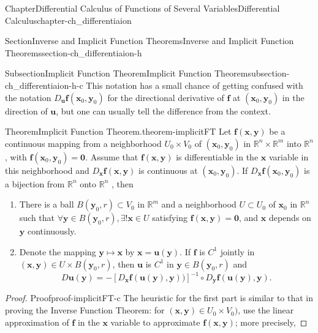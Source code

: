 \documentclass[oneside,10pt,]{book}
\numberwithin{equation}{section}
\newcommand{\bff}{\mathbf{f}}
\newcommand{\bu}{\mathbf{u}}
\newcommand{\bx}{\mathbf{x}}
\newcommand{\by}{\mathbf{y}}
\begin{document}
\begin{chapterptx}{Chapter}{Differential Calculus of Functions of Several Variables}{}{Differential Calculus}{}{}{chapter-ch_differentiaion}
\begin{sectionptx}{Section}{Inverse and Implicit Function Theorems}{}{Inverse and Implicit Function Theorems}{}{}{section-ch_differentiaion-h}
\begin{subsectionptx}{Subsection}{Implicit Function Theorem}{}{Implicit Function Theorem}{}{}{subsection-ch_differentiaion-h-c}
This notation has a small chance of getting confused with the notation \(D_{\bu}{\mathbf f}({\mathbf x}_{0},{\mathbf y}_{0})\) for the directional derivative of \(\bff\) at \(({\mathbf x}_{0},{\mathbf y}_{0})\) in the direction of \(\bu\), but one can usually tell the difference from the context.%
\begin{theorem}{Theorem}{Implicit Function Theorem.}{}{theorem-implicitFT}%
Let \({\mathbf f}({\mathbf x},{\mathbf y})\) be a continuous mapping from a neighborhood \(U_{0}\times V_{0}\) of \(({\mathbf x}_0,{\mathbf y}_0)\) in \(\mathbb R^n \times \mathbb R^m\) into \(\mathbb R^n\), with \({\mathbf f}({\mathbf x}_0,{\mathbf y}_0)={\mathbf 0}\). Assume that  \({\mathbf f}({\mathbf x},{\mathbf y})\) is differentiable in the \({\mathbf x}\) variable in this neighborhood and \(D_{{\mathbf x}}{\mathbf f}({\mathbf x},{\mathbf y})\) is continuous at \(({\mathbf x}_0,{\mathbf y}_0)\). If \(D_{{\mathbf x}}{\mathbf f}({\mathbf x}_0,{\mathbf y}_0)\) is a bijection from \(\mathbb R^n\) onto \(\mathbb R^n\) , then %
\begin{enumerate}
\item{}There is a ball \(B({\mathbf y}_0, r)\subset V_{0}\) in \(\mathbb R^m\) and a neighborhood \(U\subset U_{0}\) of \({\mathbf x}_0\) in \(\mathbb R^n\) such that \(\forall {\mathbf y} \in B({\mathbf y}_0, r), \exists ! {\mathbf x} \in U\) satisfying \(\bff({\mathbf x}, {\mathbf y})={\mathbf 0}\), and \({\mathbf x}\) depends on \({\mathbf y}\) continuously.%
\item{}Denote the mapping \({\mathbf y} \mapsto {\mathbf x}\) by \({\mathbf x} = {\mathbf u}({\mathbf y})\). If \(\bff\) is \(C^1\) jointly in \(({\mathbf x}, {\mathbf y})\in U\times B({\mathbf y}_0, r)\), then \({\mathbf u}\) is \(C^1\) in \({\mathbf y}\in B({\mathbf y}_0, r)\) and%
\begin{equation*}
D{\mathbf u} ({\mathbf y}) = -\left[D_{\mathbf x}{\mathbf f}({\mathbf u}({\mathbf y}),{\mathbf y}))\right]^{-1} \circ D_{\mathbf y}{\mathbf f}({\mathbf u}({\mathbf y}),{\mathbf y}).
\end{equation*}
%
\end{enumerate}
\end{theorem}
\begin{proof}{Proof}{}{proof-implicitFT-c}
The heuristic for the first part is similar to that in proving the Inverse Function Theorem: for \((\bx, \by)\in U_{0}\times V_{0})\), use the linear approximation of \({\mathbf f}\)  in the \({\mathbf x}\) variable to approximate \({\mathbf f}({\mathbf x}, {\mathbf y})\); more precisely,%

\end{proof}
\end{subsectionptx}
\end{sectionptx}
\end{chapterptx}
\end{document}
